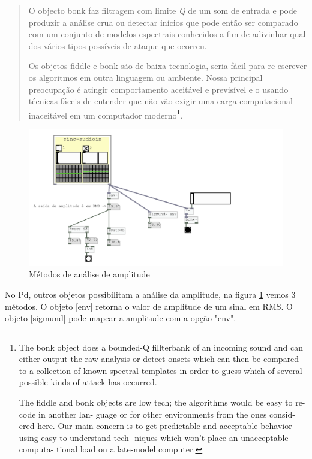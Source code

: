 \documentclass[draft]{ppgmus}
\begin{document}
\begin{quote}
O objecto bonk faz filtragem com limite \textit{Q} de um som de entrada e
pode produzir a análise crua ou detectar inícios
que pode então ser comparado com um conjunto de modelos espectrais conhecidos
a fim de adivinhar qual dos vários
tipos possíveis de ataque que ocorreu.

Os objetos fiddle e bonk são de baixa tecnologia, seria fácil para re-escrever os
algoritmos  em outra linguagem
 ou ambiente. Nossa principal preocupação é atingir comportamento aceitável e previsível e
 o usando técnicas fáceis de entender que não vão exigir uma carga computacional inaceitável
 em um computador moderno\footnote{The bonk object does a bounded-Q fillterbank of an incoming sound and
can either output the raw analysis or detect onsets
which can then be compared to a collection of known
spectral templates in order to guess which of several
possible kinds of attack has occurred.

The fiddle and bonk objects are low tech; the
algorithms would be easy to re-code in another lan-
guage or for other environments from the ones consid-
ered here. Our main concern is to get predictable and
acceptable behavior using easy-to-understand tech-
niques which won't place an unacceptable computa-
tional load on a late-model computer.}. \cite{bonk}
 
\end{quote}

\begin{figure}
\includegraphics[scale=.5]{bonks}
\caption{Métodos de análise de amplitude}
\label{bonks} 
\end{figure}


No Pd, outros objetos possibilitam a análise da amplitude,
na figura \ref{bonks} vemos 3 métodos. O objeto [env\texttildelow]
retorna o valor de amplitude de um sinal em RMS. O objeto
[sigmund\texttildelow] pode mapear a amplitude com a opção
"env".
\end{document}
